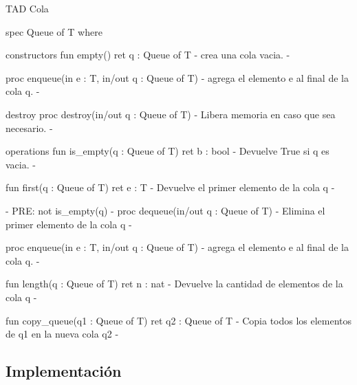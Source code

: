 \begin{codebox}{TAD Cola}
\begin{pascallike}
spec Queue of T where

constructors
    fun empty() ret q : Queue of T
    {- crea una cola vacia. -}

    proc enqueue(in e : T, in/out q : Queue of T)
    {- agrega el elemento e al final de la cola q. -}

destroy
    proc destroy(in/out q : Queue of T)
    {- Libera memoria en caso que sea necesario. -}

operations
    fun is_empty(q : Queue of T) ret b : bool
    {- Devuelve True si q es vacia. -}

    fun first(q : Queue of T) ret e : T
    {- Devuelve el primer elemento de la cola q -}

    {- PRE: not is_empty(q) -}
    proc dequeue(in/out q : Queue of T)
    {- Elimina el primer elemento de la cola q -}

    proc enqueue(in e : T, in/out q : Queue of T)
    {- agrega el elemento e al final de la cola q. -}

    fun length(q : Queue of T) ret n : nat
    {- Devuelve la cantidad de elementos de la cola q -}

    fun copy_queue(q1 : Queue of T) ret q2 : Queue of T
    {- Copia todos los elementos de q1 en la nueva cola q2 -}
\end{pascallike}
\end{codebox}

\subsection{Implementación}

